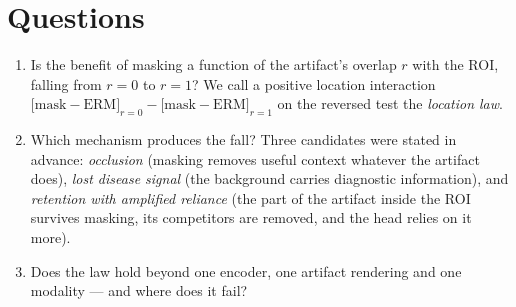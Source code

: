 \section{Questions}
\begin{enumerate}[label=\textbf{Q2\alph*},leftmargin=*]\itemsep1pt
\item Is the benefit of masking a function of the artifact's overlap $r$ with the ROI, falling from $r=0$ to $r=1$?
We call a positive location interaction $\big[\mathrm{mask}-\mathrm{ERM}\big]_{r=0}-\big[\mathrm{mask}-\mathrm{ERM}\big]_{r=1}$
on the reversed test the \emph{location law}.
\item Which mechanism produces the fall? Three candidates were stated in advance: \emph{occlusion} (masking removes
useful context whatever the artifact does), \emph{lost disease signal} (the background carries diagnostic
information), and \emph{retention with amplified reliance} (the part of the artifact inside the ROI survives masking,
its competitors are removed, and the head relies on it more).
\item Does the law hold beyond one encoder, one artifact rendering and one modality --- and where does it fail?
\end{enumerate}

